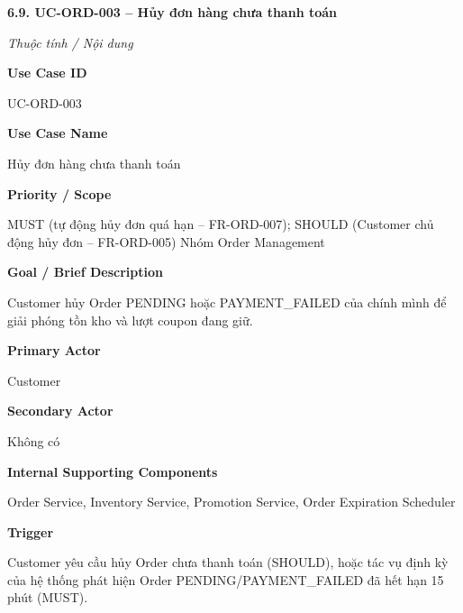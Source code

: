 \documentclass[11pt,a4paper,oneside]{report}
\begin{document}


\textbf{6.9. UC-ORD-003 -- Hủy đơn hàng chưa thanh toán}



\par\noindent\textit{Thuộc tính / Nội dung}\par

\par\smallskip\noindent\textcolor{sgublue}{\textbf{Use Case ID}}\par\nobreak
UC-ORD-003
\par

\par\smallskip\noindent\textcolor{sgublue}{\textbf{Use Case Name}}\par\nobreak
Hủy đơn hàng chưa thanh toán
\par

\par\smallskip\noindent\textcolor{sgublue}{\textbf{Priority / Scope}}\par\nobreak
MUST (tự động hủy đơn quá hạn -- FR-ORD-007); SHOULD (Customer chủ động hủy đơn -- FR-ORD-005) \textbar{} Nhóm Order Management
\par

\par\smallskip\noindent\textcolor{sgublue}{\textbf{Goal / Brief Description}}\par\nobreak
Customer hủy Order PENDING hoặc PAYMENT\_FAILED của chính mình để giải phóng tồn kho và lượt coupon đang giữ.
\par

\par\smallskip\noindent\textcolor{sgublue}{\textbf{Primary Actor}}\par\nobreak
Customer
\par

\par\smallskip\noindent\textcolor{sgublue}{\textbf{Secondary Actor}}\par\nobreak
Không có
\par

\par\smallskip\noindent\textcolor{sgublue}{\textbf{Internal Supporting Components}}\par\nobreak
Order Service, Inventory Service, Promotion Service, Order Expiration Scheduler
\par

\par\smallskip\noindent\textcolor{sgublue}{\textbf{Trigger}}\par\nobreak
Customer yêu cầu hủy Order chưa thanh toán (SHOULD), hoặc tác vụ định kỳ của hệ thống phát hiện Order PENDING/PAYMENT\_FAILED đã hết hạn 15 phút (MUST).
\par
\end{document}

